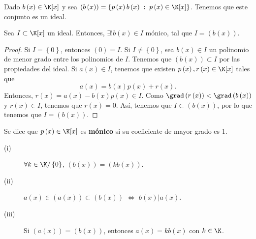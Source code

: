 \begin{observation}
\normalfont 
Dado $\displaystyle b\left(x\right) \in \K[x] $ y sea $\displaystyle \left(b\left(x\right)\right) = \left\{ p\left(x\right)b\left(x\right)\; : \; p\left(x\right) \in \K[x]\right\}  $. Tenemos que este conjunto es un ideal. 
\end{observation}
\begin{fprop}[]
	\normalfont Sea $\displaystyle I \subset \K[x] $ un ideal. Entonces, $\displaystyle \exists! b\left(x\right) \in I $ mónico, tal que $\displaystyle I = \left(b\left(x\right)\right) $.
\end{fprop}
\begin{proof}
	Si $\displaystyle I = \left\{ 0\right\}  $, entonces $\displaystyle \left(0\right) = I $. Si $\displaystyle I \neq \left\{ 0\right\}  $, sea $\displaystyle b\left(x\right) \in I $ un polinomio de menor grado entre los polinomios de $\displaystyle I $. Tenemos que $\displaystyle \left(b\left(x\right)\right) \subset I $ por las propiedades del ideal. Si $\displaystyle a\left(x\right) \in I $, tenemos que existen $\displaystyle p\left(x\right), r\left(x\right) \in \K[x] $ tales que
	\[a\left(x\right) = b\left(x\right) p\left(x\right) + r\left(x\right) .\]
Entonces, $\displaystyle r\left(x\right) = a\left(x\right)-b\left(x\right)p\left(x\right) \in I $. Como $\displaystyle \grad\left(r\left(x\right)\right) < \grad\left(b\left(x\right)\right) $ y $\displaystyle r\left(x\right) \in I $, tenemos que $\displaystyle r\left(x\right) = 0 $. Así, tenemos que $\displaystyle I \subset \left(b\left(x\right)\right) $, por lo que tenemos que $\displaystyle I = \left(b\left(x\right)\right) $.	
\end{proof}

\begin{fdefinition}[]
	\normalfont Se dice que $\displaystyle p\left(x\right) \in \K[x] $ es \textbf{mónico} si su coeficiente de mayor grado es 1.
\end{fdefinition}

\begin{observation}
\normalfont 
\begin{description}
	\item[(i)] $\displaystyle \forall k \in \K/ \left\{ 0\right\}  $, $\displaystyle \left(b\left(x\right)\right) = \left(k b\left(x\right)\right) $.
	\item[(ii)]  $\displaystyle a\left(x\right) \in \left(a\left(x\right)\right) \subset \left(b\left(x\right)\right) $  $\displaystyle \iff $ $\displaystyle b\left(x\right) | a\left(x\right) $.
	\item[(iii)] Si $\displaystyle \left(a\left(x\right)\right) = \left(b\left(x\right)\right) $, entonces $\displaystyle a\left(x\right) = kb\left(x\right) $ con $\displaystyle k \in \K $.
\end{description}
\end{observation}

